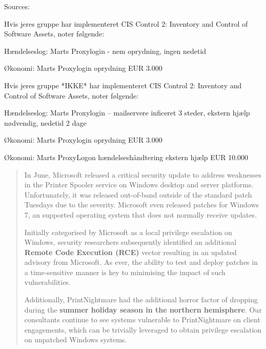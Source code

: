 \documentclass[Screen16to9,17pt]{foils}
\begin{document}
Sources: \\




Hvis jeres gruppe har implementeret CIS Control 2: Inventory and Control of Software Assets, noter følgende:
\begin{list2}
\item Hændelseslog: Marts Proxylogin - nem oprydning, ingen nedetid
\item Økonomi: Marts Proxylogin oprydning EUR 3.000
\end{list2}


Hvis jeres gruppe *IKKE* har implementeret CIS Control 2: Inventory and Control of Software Assets, noter følgende:
\begin{list2}
\item Hændelseslog: Marts Proxylogin -- mailservere inficeret 3 steder, ekstern hjælp nødvendig, nedetid 2 dage
\item Økonomi: Marts Proxylogin oprydning EUR 3.000
\item Økonomi: Marts ProxyLogon hændelseshåndtering ekstern hjælp EUR 10.000
\end{list2}



\begin{quote}

In June, Microsoft released a critical security update to address weaknesses in the Printer Spooler service on Windows desktop and server platforms. Unfortunately, it was released out-of-band outside of the standard patch Tuesdays due to the severity. Microsoft even released patches for Windows 7, an supported operating system that does not normally receive updates.

Initially categorised by Microsoft as a local privilege escalation on Windows, security researchers subsequently identified an additional {\bf Remote Code Execution (RCE)} vector resulting in an updated advisory from Microsoft. As ever, the ability to test and deploy patches in a time-sensitive manner is key to minimising the impact of such vulnerabilities.

Additionally, PrintNightmare had the additional horror factor of dropping during the {\bf summer holiday season in the northern hemisphere}. Our consultants continue to see systems vulnerable to PrintNightmare on client engagements, which can be trivially leveraged to obtain privilege escalation on unpatched Windows systems.
\end{quote}
\end{document}
